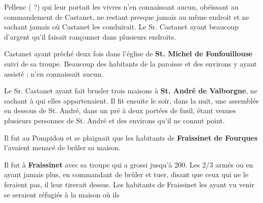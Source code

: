 Pellenc ( ?) qui leur portait les vivres n’en connaissant aucun, obéissant au commandement de Castanet, ne restant presque jamais au même endroit et ne sachant jamais où Castanet les conduirait. Le Sr. Castanet ayant beaucoup d’argent qu’il faisait rançonner dans plusieurs endroits.

Castanet ayant prêché deux fois dans l’église de \textbf{St. Michel de Fonfouillouse} suivi de sa troupe. Beaucoup des habitants de la paroisse et des environs y ayant assisté ; n’en connaissait aucun.

Le Sr. Castanet ayant fait brusler trois maisons à \textbf{St. André de Valborgne}, ne sachant à qui elles appartenaient. Il fit ensuite le soir, dans la nuit, une assemblée en dessous de St. André, dans un pré à deux portées de fusil, étant venues plusieurs personnes de St. André et des environs qu’il ne connut point.

Il fut au Pompidou et se plaignait que les habitants de \textbf{Fraissinet de Fourques} l’avaient menacé de brûler sa maison.

Il fut à \textbf{Fraissinet} avec sa troupe qui a grossi jusqu’à 200. Les 2/3 armés ou en ayant jamais plus, en commandant de brûler et tuer, disant que ceux qui ne le feraient pas, il leur tirerait dessus. Les habitants de Fraissinet les ayant vu venir se seraient réfugiés à la maison où ils

